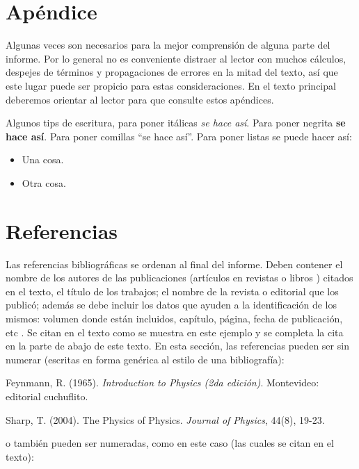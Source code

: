 \documentclass{article}
\begin{document}
\section*{Apéndice}

Algunas veces son necesarios para la mejor comprensión de alguna parte del informe. Por lo general no es conveniente distraer al lector con muchos cálculos, despejes de términos y propagaciones de errores en la mitad del texto, así que este lugar puede ser propicio para estas consideraciones. En el texto principal deberemos orientar al lector para que consulte estos apéndices.

Algunos tips de escritura, para poner itálicas \textit{se hace así}. Para poner negrita \textbf{se hace así}. Para poner comillas ``se hace así''. Para poner listas se puede hacer así:

\begin{itemize}
  \item Una cosa.
  \item Otra cosa.
\end{itemize}


\section*{Referencias}

Las referencias bibliográficas se ordenan al final del informe. Deben contener el nombre de los autores de las publicaciones (artículos en revistas \cite{bb} o libros \cite{aa}) citados en el texto, el título de los trabajos; el nombre de la revista o editorial que los publicó; además se debe incluir los datos que ayuden a la identificación de los mismos: volumen donde están incluidos, capítulo, página, fecha de publicación, etc \cite{bb,aa,cc}. Se citan en el texto como se muestra en este ejemplo y se completa la cita en la parte de abajo de este texto. En esta sección, las referencias pueden ser sin numerar (escritas en forma genérica al estilo de una bibliografía):

\bigskip
\noindent Feynmann, R. (1965). \textit{Introduction to Physics (2da edición)}. Montevideo: editorial cuchuflito.

\bigskip
\noindent Sharp, T. (2004). The Physics of Physics. \textit{Journal of Physics}, 44(8), 19-23.

\bigskip
\noindent o también pueden ser numeradas, como en este caso (las cuales se citan en el texto):
\end{document}
